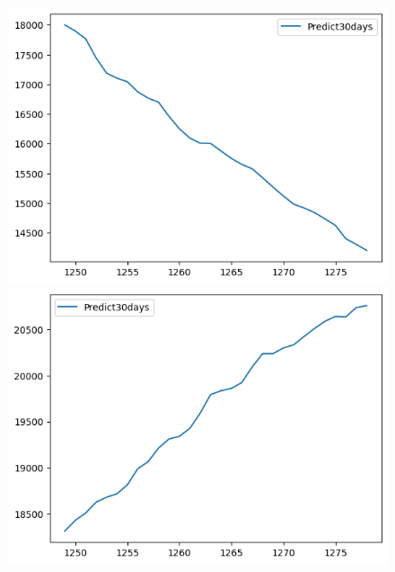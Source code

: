 \begin{figure}[H]
\begin{minipage}{0.15\textwidth}
    \includegraphics[width=1\textwidth]{resources/chapter-5/predicted/EIB_ RNN_7-3_30days.png}
    \end{minipage}
    \hfill
    \begin{minipage}{0.15\textwidth}
    \centering
    \includegraphics[width=1\textwidth]{resources/chapter-5/predicted/EIB_ RNN_8-2_30days.png}
    \end{minipage}
    \hfill
        \begin{minipage}{0.15\textwidth}
    \centering

\end{minipage}
\end{figure}
